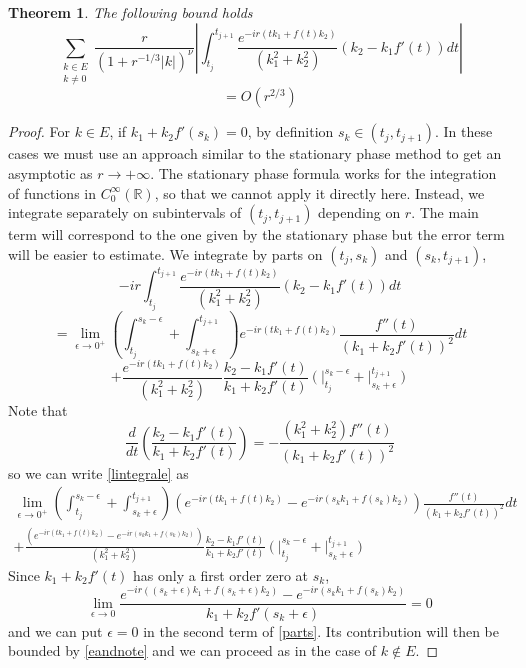 \documentclass[12pt]{amsart}
\numberwithin{equation}{subsection}
\theoremstyle{definition}
\theoremstyle{plain}
\newtheorem{theorem}[equation]{Theorem}
\begin{document}
\begin{theorem}
\label{lmc}
The following bound holds
\[
\sum_{\substack{k \in E \\ k \neq 0}} \frac{r}{(1+r^{-1/3}|k|)^\nu}
\left| \int_{t_j}^{t_{j+1}} \frac{e^{-ir(t k_1 + f(t) k_2)}}{(k_1^2 + k_2^2)}
(k_2  - k_1 f'(t)) dt \right|
\]
\[
= O(r^{2/3})
\]
\end{theorem}
\begin{proof}
For $k \in E$, if $k_1 + k_2 f'(s_k) = 0$, by definition $s_k \in (t_j,t_{j+1})$.
In these cases we must use an approach similar to the stationary phase method to get an asymptotic as $r \rightarrow +\infty$. The stationary phase formula
works for the integration of functions in $C^{\infty}_{0}(\mathbb R)$, so that
we cannot apply it directly here. Instead,
we integrate separately on subintervals of $(t_j,t_{j+1})$ depending on $r$.
The main term will correspond to the one given by the stationary phase but the error term will be easier to estimate.
We integrate by parts on $(t_j,s_k)$ and $(s_k,t_{j+1})$,
\begin{equation}
\label{lintegrale}
-ir \int_{t_j}^{t_{j+1}} \frac{e^{-ir(t k_1 + f(t) k_2)}}{(k_1^2 + k_2^2)}(k_2 - k_1 f'(t))dt
\end{equation}
\[
= \lim_{\epsilon \rightarrow 0^{+}} \left( \int_{t_j}^{s_k-\epsilon}  + \int_{s_k+\epsilon}^{t_{j+1}} \right)
e^{-ir(t k_1 + f(t) k_2)}\frac{f''(t)}{(k_1 + k_2 f'(t))^2}dt
\]
\[
+ \frac{ e^{-ir(t k_1 + f(t) k_2)}}{(k_1^2+k_2^2)} \frac{k_2 - k_1 f'(t)}{k_1+k_2 f'(t)}  \left( \left. \right|_{t_j}^{s_k-\epsilon} +
\left. \right|_{s_k+\epsilon}^{t_{j+1}} \right)
\]
Note that
\[
\frac{d}{dt} \left(\frac{k_2 - k_1 f'(t)}{k_1 + k_2 f'(t)}\right) = -\frac{(k_1^2+k_2^2)f''(t)}{(k_1+k_2 f'(t))^2}
\]
so we can write \eqref{lintegrale} as
\begin{multline}
\label{parts}
\lim_{\epsilon \rightarrow 0^{+}} \left( \int_{t_j}^{s_k-\epsilon}  + \int_{s_k+\epsilon}^{t_{j+1}} \right)
(e^{-ir(t k_1 + f(t) k_2)}-e^{-ir(s_k k_1 + f(s_k) k_2)})\frac{f''(t)}{(k_1 + k_2 f'(t))^2}dt
\\
+ \frac{ (e^{-ir(t k_1 + f(t) k_2)}-e^{-ir(s_k k_1 + f(s_k) k_2)})}{(k_1^2+k_2^2)} \frac{k_2 - k_1 f'(t)}{k_1+k_2 f'(t)}
\left( \left. \right|_{t_j}^{s_k-\epsilon} +
\left. \right|_{s_k+\epsilon}^{t_{j+1}} \right)
\end{multline}
Since $k_1+k_2 f'(t)$ has only a first order zero at $s_k$,
\[
\lim_{\epsilon \rightarrow 0} \frac{e^{-ir((s_k + \epsilon) k_1 + f(s_k + \epsilon) k_2)}
-e^{-ir(s_k k_1 + f(s_k) k_2)}}{k_1+k_2 f'(s_k + \epsilon)}
= 0
\]
and we can put $\epsilon = 0$ in the second term of \eqref{parts}.
Its contribution will then be bounded by \eqref{eandnote} and we can proceed as in the case
of $k \notin E$.


\end{proof}
\end{document}
